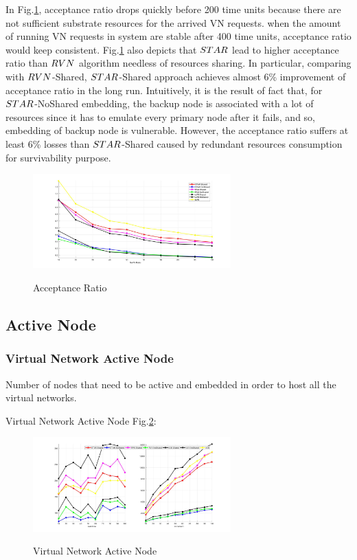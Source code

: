 In Fig.\ref{fig:AcceptionRatio}, acceptance ratio drops quickly before 200 time units because there are not sufficient substrate resources for the arrived VN requests. when the amount of running VN requests in system are stable after 400 time units, acceptance ratio would keep consistent. Fig.\ref{fig:AcceptionRatio} also depicts that $STAR$ lead to higher acceptance ratio than $RVN$ algorithm needless of resources sharing. In particular, comparing with $RVN$-Shared, $STAR$-Shared approach achieves almost 6\% improvement of acceptance ratio in the long run. Intuitively, it is the result of fact that, for $STAR$-NoShared embedding, the backup node is associated with a lot of resources since it has to emulate every primary node after it fails, and so, embedding of backup node is vulnerable. However, the acceptance ratio suffers at least 6\% losses than $STAR$-Shared caused by redundant resources consumption for survivability purpose.

\begin{figure}[htbp]
  \centering
  \includegraphics[width=3in]{Fig/AcceptionRatio}\\
  \caption{Acceptance Ratio}\label{fig:AcceptionRatio}
\end{figure}
\subsection{Active Node}
\subsubsection{Virtual Network Active Node}
Number of nodes that need to be active and embedded in order to host all the virtual networks.

Virtual Network Active Node Fig.\ref{fig:ActiveNodeVirtualNetwork}:
\begin{figure}[htbp]
  \centering
  \includegraphics[width=3in]{Fig/ActiveNodeVirtualNetwork}\\
  \caption{Virtual Network Active Node}\label{fig:ActiveNodeVirtualNetwork}
\end{figure}

